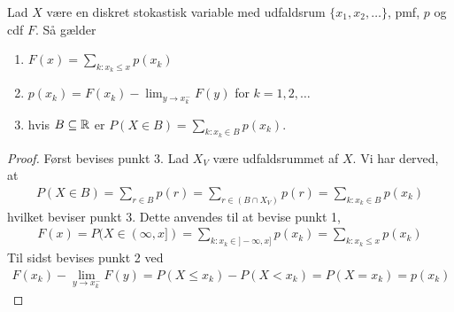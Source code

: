 \begin{prop}%
Lad $X$ være en diskret stokastisk variable med udfaldsrum $\{x_1, x_2, \ldots\}$, pmf, $p$ og cdf $F$. Så gælder
\begin{enumerate}
    \item $F(x)=\displaystyle \sum_{k:x_k \leq x} p(x_k)$
    \item $p(x_k)=F(x_k)- \displaystyle \lim_{y \rightarrow x_k^- } F(y)$ for $k= 1,2, \ldots $
    \item hvis $B \subseteq \mathbb{R}$ er $P(X \in B)= \displaystyle \sum_{k:x_k \in B} p(x_k)$.
\end{enumerate}
\end{prop} 
\begin{proof}
Først bevises punkt 3. Lad $X_V$ være udfaldsrummet af $X$. Vi har derved, at
\begin{align*}
    P(X\in B)=\sum_{r\in B}p(r)=\sum_{r\in(B\cap X_V)}p(r)=\sum_{k:x_k\in B}p(x_k)
\end{align*}
hvilket beviser punkt 3. Dette anvendes til at bevise punkt 1,
\begin{align*}
    F(x)=P(X\in(\infty,x])=\sum_{k:x_k\in ]-\infty,x]}p(x_k)=\sum_{k:x_k\leq x}p(x_k)
\end{align*}
Til sidst bevises punkt 2 ved
\begin{align*}
    F(x_k)-\lim_{y\rightarrow x_k^-}F(y)=P(X\leq x_k)-P(X<x_k)=P(X=x_k)=p(x_k)
\end{align*}
\end{proof}